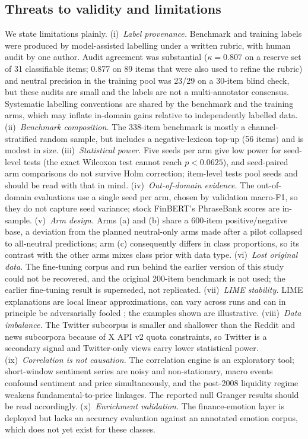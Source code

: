 \documentclass{aims}
\numberwithin{equation}{section}
\begin{document}
\subsection{Threats to validity and limitations}
We state limitations plainly. (i)~\emph{Label provenance.} Benchmark and training
labels were produced by model-assisted labelling under a written rubric, with human
audit by one author. Audit agreement was substantial ($\kappa = 0.807$ on a reserve
set of 31 classifiable items; 0.877 on 89 items that were also used to refine the
rubric) and neutral precision in the training pool was 23/29 on a 30-item blind
check, but these audits are small and the labels are not a multi-annotator
consensus. Systematic labelling conventions are shared by the benchmark and the
training arms, which may inflate in-domain gains relative to independently labelled
data. (ii)~\emph{Benchmark composition.} The 338-item benchmark is mostly a
channel-stratified random sample, but includes a negative-lexicon top-up (56 items)
and is modest in size. (iii)~\emph{Statistical power.} Five seeds per arm give low
power for seed-level tests (the exact Wilcoxon test cannot reach $p < 0.0625$), and
seed-paired arm comparisons do not survive Holm correction; item-level tests pool
seeds and should be read with that in mind. (iv)~\emph{Out-of-domain evidence.} The
out-of-domain evaluations use a single seed per arm, chosen by validation macro-F1,
so they do not capture seed variance; stock FinBERT's PhraseBank scores are
in-sample. (v)~\emph{Arm design.} Arms (a) and (b) share a 600-item
positive/negative base, a deviation from the planned neutral-only arms made after a
pilot collapsed to all-neutral predictions; arm (c) consequently differs in class
proportions, so its contrast with the other arms mixes class prior with data type.
(vi)~\emph{Lost original data.} The fine-tuning corpus and run behind the earlier
version of this study could not be recovered, and the original 200-item benchmark
is not used; the earlier fine-tuning result is superseded, not replicated.
(vii)~\emph{LIME stability.} LIME explanations are local linear approximations, can
vary across runs and can in principle be adversarially fooled \citep{slack2020};
the examples shown are illustrative. (viii)~\emph{Data imbalance.} The
Twitter subcorpus is smaller and shallower than the Reddit and news subcorpora
because of X API v2 quota constraints, so Twitter is a secondary signal and
Twitter-only views carry lower statistical power. (ix)~\emph{Correlation is not
causation.} The correlation engine is an exploratory tool; short-window sentiment
series are noisy and non-stationary, macro events confound sentiment and price
simultaneously, and the post-2008 liquidity regime weakens fundamental-to-price
linkages. The reported null Granger results should be read accordingly.
(x)~\emph{Enrichment validation.} The finance-emotion layer is deployed but lacks an
accuracy evaluation against an annotated emotion corpus, which does not yet exist for
these classes.
\end{document}

